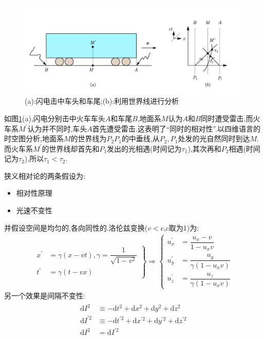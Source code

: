 \begin{figure}[htbp]
    \centering
 \includegraphics[width=\textwidth]{img/6-3.png}
    \caption{(a):闪电击中车头和车尾;(b):利用世界线进行分析}
    \label{fig:6-3}
\end{figure}

如图\ref{fig:6-3}(a),闪电分别击中火车车头$A$和车尾$B$,地面系$M$认为$A$和$B$同时遭受雷击,而火车系$M^\prime$认为并不同时,车头$A$首先遭受雷击.这表明了“同时的相对性”.以四维语言的时空图分析,地面系$M$的世界线为$P_2P_1$的中垂线,从$P_2,P_1$处发的光自然同时到达$M$.而火车系$M^\prime$的世界线却首先和$P_1$发出的光相遇(时间记为$\tau_1$),其次再和$P_2$相遇(时间记为$\tau_2$),所以$\tau_1<\tau_2$.

狭义相对论的两条假设为:
\begin{itemize}
\item 相对性原理
\item 光速不变性
\end{itemize}
并假设空间是均匀的,各向同性的.洛伦兹变换($v<c$,$c$取为1)为:
\begin{align}
    \left.
\begin{aligned}
    x^\prime&=\gamma(x-vt),\gamma=\dfrac{1}{\sqrt{1-v^2}}\\
    t^\prime&=\gamma(t-vx)
\end{aligned}
\right\}\Rightarrow
\left\{
\begin{aligned}
    u_x^\prime&=\dfrac{u_x-v}{1-u_xv}\\
    u_y^\prime&=\dfrac{u_y}{\gamma(1-u_xv)}\\
    u_z^\prime&=\dfrac{u_z}{\gamma(1-u_xv)}
\end{aligned}
\right.
\end{align}
另一个效果是间隔不变性:
\begin{align}
    \begin{aligned}
        \text{d}I^2&\equiv-\text{d}t^2+\text{d}x^2+\text{d}y^2+\text{d}z^2\\
        \text{d}I^{\prime2}&\equiv-\text{d}t^{\prime2}+\text{d}x^{\prime2}+\text{d}y^{\prime2}+\text{d}z^{\prime2}\\
        \text{d}I^2&=\text{d}I^{\prime2}
    \end{aligned}
\end{align}

